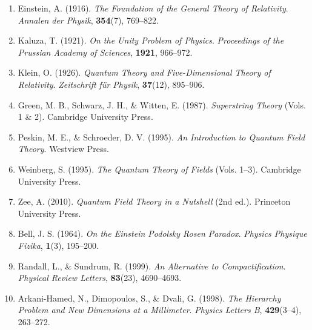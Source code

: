 \documentclass[11pt,a4paper]{article}
\begin{document}
\begin{enumerate}
    \item Einstein, A. (1916). \textit{The Foundation of the General Theory of Relativity}. \textit{Annalen der Physik}, \textbf{354}(7), 769–822.
    \item Kaluza, T. (1921). \textit{On the Unity Problem of Physics}. \textit{Proceedings of the Prussian Academy of Sciences}, \textbf{1921}, 966–972.
    \item Klein, O. (1926). \textit{Quantum Theory and Five-Dimensional Theory of Relativity}. \textit{Zeitschrift für Physik}, \textbf{37}(12), 895–906.
    \item Green, M. B., Schwarz, J. H., \& Witten, E. (1987). \textit{Superstring Theory} (Vols. 1 \& 2). Cambridge University Press.
    \item Peskin, M. E., \& Schroeder, D. V. (1995). \textit{An Introduction to Quantum Field Theory}. Westview Press.
    \item Weinberg, S. (1995). \textit{The Quantum Theory of Fields} (Vols. 1–3). Cambridge University Press.
    \item Zee, A. (2010). \textit{Quantum Field Theory in a Nutshell} (2nd ed.). Princeton University Press.
    \item Bell, J. S. (1964). \textit{On the Einstein Podolsky Rosen Paradox}. \textit{Physics Physique Fizika}, \textbf{1}(3), 195–200.
    \item Randall, L., \& Sundrum, R. (1999). \textit{An Alternative to Compactification}. \textit{Physical Review Letters}, \textbf{83}(23), 4690–4693.
    \item Arkani-Hamed, N., Dimopoulos, S., \& Dvali, G. (1998). \textit{The Hierarchy Problem and New Dimensions at a Millimeter}. \textit{Physics Letters B}, \textbf{429}(3–4), 263–272.
\end{enumerate}
\end{document}
